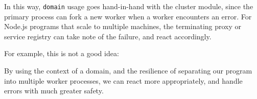 In this way, \texttt{domain} usage goes hand-in-hand with the cluster
module, since the primary process can fork a new worker when a worker
encounters an error. For Node.js programs that scale to multiple
machines, the terminating proxy or service registry can take note of the
failure, and react accordingly.

For example, this is not a good idea:

\begin{Shaded}
\begin{Highlighting}[]

\OperatorTok{=} \NormalTok{(}\NormalTok{)}\NormalTok{()}\OperatorTok{;}
\NormalTok{(}\OperatorTok{,}\KeywordTok{=\textgreater{}}\NormalTok{ \{}
  \NormalTok{(}\SpecialCharTok{$\{}\SpecialCharTok{\}}\VerbatimStringTok{\textasciigrave{}}\NormalTok{)}\OperatorTok{;}
\NormalTok{\})}\OperatorTok{;}
\NormalTok{(() }\KeywordTok{=\textgreater{}}\NormalTok{ \{}
  \NormalTok{(}\NormalTok{)}\OperatorTok{,}\KeywordTok{=\textgreater{}}\NormalTok{ \{}
    \OperatorTok{,}\OperatorTok{;}
\NormalTok{  \})}\OperatorTok{;}
\NormalTok{\})}\OperatorTok{;}
\end{Highlighting}
\end{Shaded}

By using the context of a domain, and the resilience of separating our
program into multiple worker processes, we can react more appropriately,
and handle errors with much greater safety.

